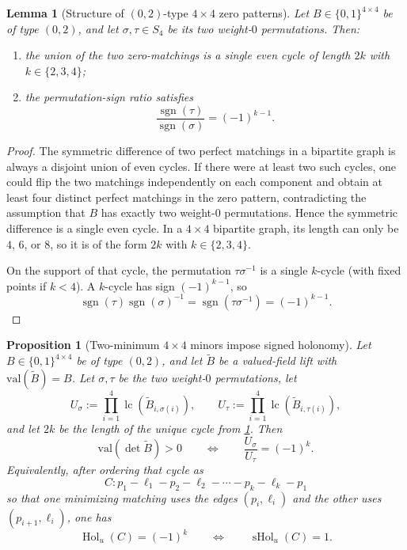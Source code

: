 \documentclass[11pt]{amsart}
\numberwithin{equation}{section}
\theoremstyle{plain}
\newtheorem{lemma}[theorem]{Lemma}
\newtheorem{proposition}[theorem]{Proposition}
\theoremstyle{definition}
\theoremstyle{remark}
\newcommand{\val}{\mathrm{val}}
\begin{document}
\begin{lemma}[Structure of $(0,2)$-type $4\times4$ zero patterns]
\label{lem:02-single-cycle}
Let $B\in\{0,1\}^{4\times4}$ be of type $(0,2)$, and let $\sigma,\tau\in S_4$ be its two weight-$0$ permutations. Then:
\begin{enumerate}[leftmargin=2em]
  \item the union of the two zero-matchings is a single even cycle of length $2k$ with $k\in\{2,3,4\}$;
  \item the permutation-sign ratio satisfies
  \[
  \frac{\operatorname{sgn}(\tau)}{\operatorname{sgn}(\sigma)}=(-1)^{k-1}.
  \]
\end{enumerate}
\end{lemma}

\begin{proof}
The symmetric difference of two perfect matchings in a bipartite graph is always a disjoint union of even cycles. If there were at least
two such cycles, one could flip the two matchings independently on each component and obtain at least four distinct perfect matchings in
the zero pattern, contradicting the assumption that $B$ has exactly two weight-$0$ permutations. Hence the symmetric difference is a
single even cycle. In a $4\times4$ bipartite graph, its length can only be $4$, $6$, or $8$, so it is of the form $2k$ with
$k\in\{2,3,4\}$.

On the support of that cycle, the permutation $\tau\sigma^{-1}$ is a single $k$-cycle (with fixed points if $k<4$). A $k$-cycle has sign
$(-1)^{k-1}$, so
\[
\operatorname{sgn}(\tau)\operatorname{sgn}(\sigma)^{-1}=\operatorname{sgn}(\tau\sigma^{-1})=(-1)^{k-1}.
\]
\end{proof}

\begin{proposition}[Two-minimum $4\times4$ minors impose signed holonomy]
\label{prop:02-signed-holonomy}
Let $B\in\{0,1\}^{4\times4}$ be of type $(0,2)$, and let $\widetilde B$ be a valued-field lift with $\val(\widetilde B)=B$.
Let $\sigma,\tau$ be the two weight-$0$ permutations, let
\[
U_{\sigma}:=\prod_{i=1}^4 \operatorname{lc}(\widetilde B_{i,\sigma(i)}),
\qquad
U_{\tau}:=\prod_{i=1}^4 \operatorname{lc}(\widetilde B_{i,\tau(i)}),
\]
and let $2k$ be the length of the unique cycle from \cref{lem:02-single-cycle}. Then
\[
\val(\det \widetilde B)>0
\qquad\Longleftrightarrow\qquad
\frac{U_{\sigma}}{U_{\tau}}=(-1)^k.
\]
Equivalently, after ordering that cycle as
\[
C:p_1-\ell_1-p_2-\ell_2-\cdots-p_k-\ell_k-p_1
\]
so that one minimizing matching uses the edges $(p_i,\ell_i)$ and the other uses $(p_{i+1},\ell_i)$, one has
\[
\operatorname{Hol}_{u}(C)=(-1)^k
\qquad\Longleftrightarrow\qquad
\operatorname{sHol}_{u}(C)=1.
\]
\end{proposition}
\end{document}
